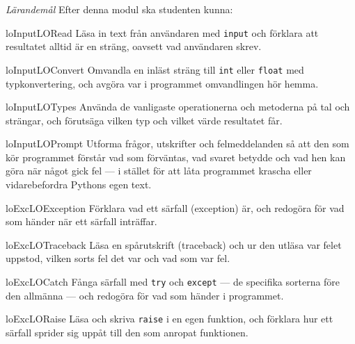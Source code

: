 \emph{Lärandemål}
Efter denna modul ska studenten kunna:
\begin{restatable}{lo}{InputLORead}\label{InputLORead}%
  Läsa in text från användaren med \texttt{input} och
  förklara att resultatet alltid är en sträng, oavsett vad användaren
  skrev.
\end{restatable}%
\begin{restatable}{lo}{InputLOConvert}\label{InputLOConvert}%
  Omvandla en inläst sträng till \texttt{int} eller
  \texttt{float} med typkonvertering, och avgöra var i
  programmet omvandlingen hör hemma.
\end{restatable}%
\begin{restatable}{lo}{InputLOTypes}\label{InputLOTypes}%
  Använda de vanligaste operationerna och metoderna på tal och strängar,
  och förutsäga vilken typ och vilket värde resultatet får.
\end{restatable}%
\begin{restatable}{lo}{InputLOPrompt}\label{InputLOPrompt}%
  Utforma frågor, utskrifter och felmeddelanden så att den som kör
  programmet förstår vad som förväntas, vad svaret betydde och vad hen
  kan göra när något gick fel --- i stället för att låta programmet
  krascha eller vidarebefordra Pythons egen text.
\end{restatable}%
\begin{restatable}{lo}{ExcLOException}\label{ExcLOException}%
  Förklara vad ett särfall (\foreignlanguage{english}{exception}) är,
  och redogöra för vad som händer när ett särfall inträffar.
\end{restatable}%
\begin{restatable}{lo}{ExcLOTraceback}\label{ExcLOTraceback}%
  Läsa en spårutskrift (\foreignlanguage{english}{traceback}) och ur
  den utläsa var felet uppstod, vilken sorts fel det var och vad som var
  fel.
\end{restatable}%
\begin{restatable}{lo}{ExcLOCatch}\label{ExcLOCatch}%
  Fånga särfall med \texttt{try} och
  \texttt{except} --- de specifika sorterna före den
  allmänna --- och redogöra för vad som händer i programmet.
\end{restatable}%
\begin{restatable}{lo}{ExcLORaise}\label{ExcLORaise}%
  Läsa och skriva \texttt{raise} i en egen funktion, och
  förklara hur ett särfall sprider sig uppåt till den som anropat
  funktionen.
\end{restatable}%

